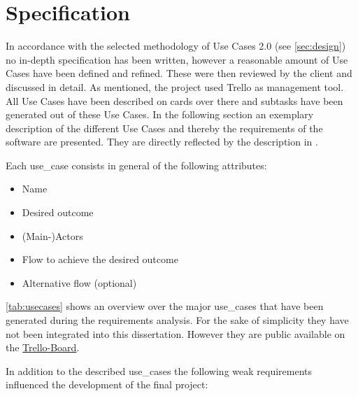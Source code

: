 \section{Specification}
\label{sec:specification}

In accordance with the selected methodology of Use Cases 2.0 (see \autoref{sec:design}) no in-depth specification has been written, however a reasonable amount of Use Cases have been defined and refined. These were then reviewed by the client and discussed in detail. As mentioned, the project used Trello as management tool. All Use Cases have been described on cards over there and subtasks have been generated out of these Use Cases. In the following section an exemplary description of the different Use Cases and thereby the requirements of the software are presented. They are directly reflected by the description in \cite{sassoon2014,sassoon2016, sassoon2016CD}.

Each \gls{use_case} consists in general of the following attributes:

\begin{itemize}
\item Name
\item Desired outcome
\item (Main-)\glspl{Actor}
\item Flow to achieve the desired outcome
\item Alternative flow (optional)
\end{itemize}


\autoref{tab:usecases} shows an overview over the major \glspl{use_case} that have been generated during the requirements analysis. For the sake of simplicity they have not been integrated into this dissertation. However they are public available on the \href{https://trello.com/b/ywCkicpc}{Trello-Board}.

In addition to the described \glspl{use_case} the following weak requirements influenced the development of the final project:

